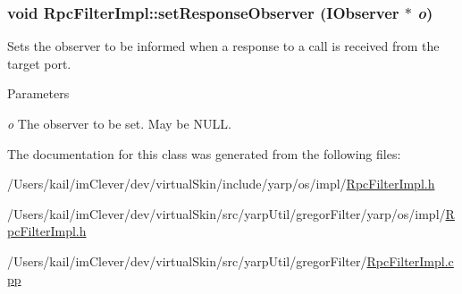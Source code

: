 \hypertarget{classyarp_1_1os_1_1impl_1_1_rpc_filter_impl_af31c769d6b5e50170d080aea6aa650c5}{
\subsubsection[{setResponseObserver}]{\setlength{\rightskip}{0pt plus 5cm}void RpcFilterImpl::setResponseObserver ({\bf IObserver} $\ast$ {\em o})}}
\label{classyarp_1_1os_1_1impl_1_1_rpc_filter_impl_af31c769d6b5e50170d080aea6aa650c5}
Sets the observer to be informed when a response to a call is received from the target port. 
\begin{DoxyParams}{Parameters}
\item[{\em o}]The observer to be set. May be {\ttfamily NULL}. \end{DoxyParams}


The documentation for this class was generated from the following files:\begin{DoxyCompactItemize}
\item 
/Users/kail/imClever/dev/virtualSkin/include/yarp/os/impl/\hyperlink{include_2yarp_2os_2impl_2_rpc_filter_impl_8h}{RpcFilterImpl.h}\item 
/Users/kail/imClever/dev/virtualSkin/src/yarpUtil/gregorFilter/yarp/os/impl/\hyperlink{src_2yarp_util_2gregor_filter_2yarp_2os_2impl_2_rpc_filter_impl_8h}{RpcFilterImpl.h}\item 
/Users/kail/imClever/dev/virtualSkin/src/yarpUtil/gregorFilter/\hyperlink{_rpc_filter_impl_8cpp}{RpcFilterImpl.cpp}\end{DoxyCompactItemize}
